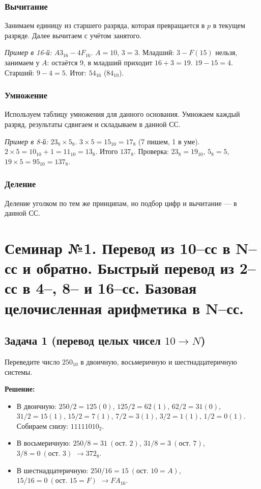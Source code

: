 \subsubsection*{Вычитание}
Занимаем единицу из старшего разряда, которая превращается в $p$ в текущем разряде. Далее вычитаем с учётом занятого.

\textit{Пример в 16-й:} $A3_{16} - 4F_{16}$.
$A=10$, $3=3$. Младший: $3 - F(15)$ нельзя, занимаем у $A$: остаётся 9, в младший приходит $16+3=19$. $19-15=4$. Старший: $9-4=5$. Итог: $54_{16}$ ($84_{10}$).

\subsubsection*{Умножение}
Используем таблицу умножения для данного основания. Умножаем каждый разряд, результаты сдвигаем и складываем в данной СС.

\textit{Пример в 8-й:} $23_8 \times 5_8$.
$3\times5=15_{10}=17_8$ (7 пишем, 1 в уме). $2\times5=10_{10}+1=11_{10}=13_8$. Итого $137_8$. Проверка: $23_8=19_{10}$, $5_8=5$, $19\times5=95_{10}=137_8$.

\subsubsection*{Деление}
Деление уголком по тем же принципам, но подбор цифр и вычитание — в данной СС.




\newpage
\section{Семинар №1. Перевод из 10–сс в N–сс и обратно. Быстрый перевод из 2–сс в 4–, 8– и 16–сс. Базовая целочисленная арифметика в N–сс.}

\subsection*{Задача 1 (перевод целых чисел $10 \to N$)}
Переведите число $250_{10}$ в двоичную, восьмеричную и шестнадцатеричную системы.

\textbf{Решение:}
\begin{itemize}
    \item В двоичную: $250 / 2 = 125 (0)$, $125/2=62 (1)$, $62/2=31 (0)$, $31/2=15 (1)$, $15/2=7 (1)$, $7/2=3 (1)$, $3/2=1 (1)$, $1/2=0 (1)$. Собираем снизу: $11111010_2$.
    \item В восьмеричную: $250 / 8 = 31\ (\text{ост. }2)$, $31/8=3\ (\text{ост. }7)$, $3/8=0\ (\text{ост. }3)$ $\to 372_8$.
    \item В шестнадцатеричную: $250 / 16 = 15\ (\text{ост. }10=A)$, $15/16=0\ (\text{ост. }15=F)$ $\to FA_{16}$.
\end{itemize}

